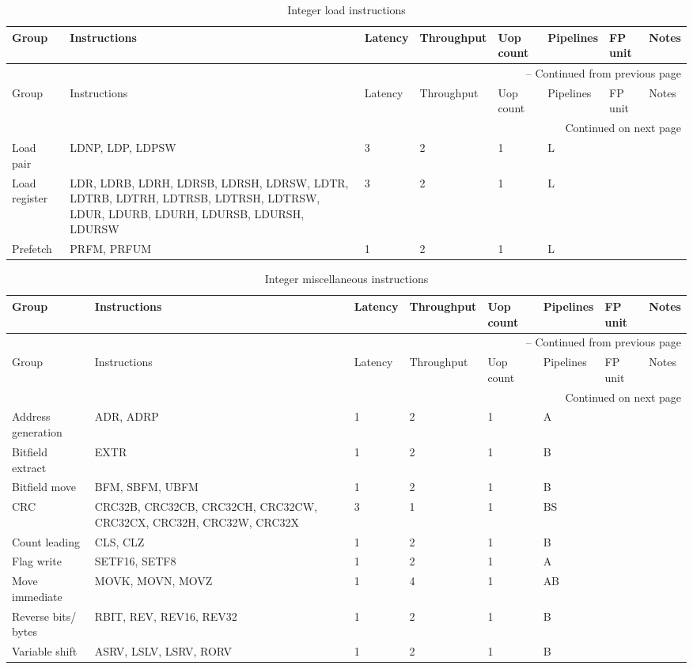 \begin{longtable}{|p{1in}|p{1in}|l|l|l|p{1in}|l|p{1in}|}
\caption{Integer load instructions} \\
\hline
Group & Instructions & Latency & Throughput & Uop count & Pipelines & FP unit & Notes\\
\hline
\endfirsthead
\hline
\multicolumn{8}{|r|}{{\tablename\ \thetable{} -- Continued from previous page}} \\
\hline
Group & Instructions & Latency & Throughput & Uop count & Pipelines & FP unit & Notes\\
\hline
\endhead
\hline
\multicolumn{8}{|r|}{{Continued on next page}} \\
\hline
\endfoot
\hline
\endlastfoot
Load pair & LDNP, LDP, LDPSW & 3 & 2 & 1 & L &  & \\
\hline
Load register & LDR, LDRB, LDRH, LDRSB, LDRSH, LDRSW, LDTR, LDTRB, LDTRH, LDTRSB, LDTRSH, LDTRSW, LDUR, LDURB, LDURH, LDURSB, LDURSH, LDURSW & 3 & 2 & 1 & L &  & \\
\hline
Prefetch & PRFM, PRFUM & 1 & 2 & 1 & L &  & \\
\hline
\end{longtable}
\begin{longtable}{|p{1in}|p{1in}|l|l|l|p{1in}|l|p{1in}|}
\caption{Integer miscellaneous instructions} \\
\hline
Group & Instructions & Latency & Throughput & Uop count & Pipelines & FP unit & Notes\\
\hline
\endfirsthead
\hline
\multicolumn{8}{|r|}{{\tablename\ \thetable{} -- Continued from previous page}} \\
\hline
Group & Instructions & Latency & Throughput & Uop count & Pipelines & FP unit & Notes\\
\hline
\endhead
\hline
\multicolumn{8}{|r|}{{Continued on next page}} \\
\hline
\endfoot
\hline
\endlastfoot
Address generation & ADR, ADRP & 1 & 2 & 1 & A &  & \\
\hline
Bitfield extract & EXTR & 1 & 2 & 1 & B &  & \\
\hline
Bitfield move & BFM, SBFM, UBFM & 1 & 2 & 1 & B &  & \\
\hline
CRC & CRC32B, CRC32CB, CRC32CH, CRC32CW, CRC32CX, CRC32H, CRC32W, CRC32X & 3 & 1 & 1 & BS &  & \\
\hline
Count leading & CLS, CLZ & 1 & 2 & 1 & B &  & \\
\hline
Flag write & SETF16, SETF8 & 1 & 2 & 1 & A &  & \\
\hline
Move immediate & MOVK, MOVN, MOVZ & 1 & 4 & 1 & AB &  & \\
\hline
Reverse bits/ bytes & RBIT, REV, REV16, REV32 & 1 & 2 & 1 & B &  & \\
\hline
Variable shift & ASRV, LSLV, LSRV, RORV & 1 & 2 & 1 & B &  & \\
\hline
\end{longtable}
